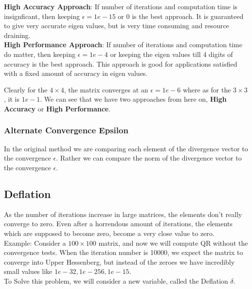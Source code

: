 \documentclass[12pt]{article}
\begin{document}
		\textbf{High Accuracy Approach}: If number of iterations and computation time is insignficant, then keeping $\epsilon = 1e-15 \text{ or } 0$ is the best approach. It is guaranteed to give very accurate eigen values, but is very time consuming and resource draining. \\
		\textbf{High Performance Approach}: If number of iterations and computation time do matter, then keeping $\epsilon = 1e-4 $ or keeping the eigen values till 4 digits of accuracy is the best approach. This approach is good for applications satisfied with a fixed amount of accuracy in eigen values.

		Clearly for the $4\times 4$, the matrix converges at an $\epsilon = 1e-6$ where as for the $3\times 3$, it is $1e-1$. We can see that we have two approaches from here on, \textbf{High Accuracy} or \textbf{High Performance}.\\
		\subsubsection{Alternate Convergence Epsilon}
		In the original method we are comparing each element of the divergence vector to the convergence $\epsilon$. Rather we can compare the norm of the divergence vector to the convergence $\epsilon$.
		\subsection{Deflation}
		As the number of iterations increase in large matrices, the elements don't really converge to zero. Even after a horrendous amount of iterations, the elements which are supposed to become zero, become a very close value to zero.\\
		Example: Consider a $100 \times 100$ matrix, and now we will compute QR without the convergence tests. When the iteration number is 10000, we expect the matrix to converge into Upper Hessenberg, but instead of the zeroes we have incredibly small values like $1e-32, 1e-256, 1e-15$. \\
		To Solve this problem, we will consider a new variable, called the Deflation $\delta$. 
\end{document}
